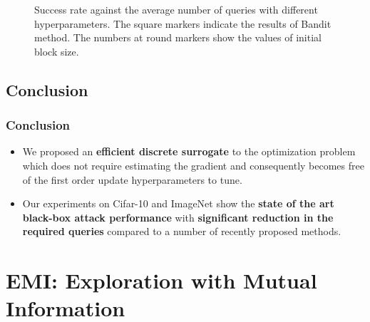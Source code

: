 \documentclass[10pt,mathserif]{beamer}
\begin{document}
\begin{frame}
\begin{figure}
    	\caption{Success rate against the average number of queries with different hyperparameters. The square markers indicate the results of Bandit method. The numbers at round markers show the values of initial block size.}
	\end{figure}
\end{frame}


\subsection{Conclusion}

\begin{frame}
    \frametitle{Conclusion}
    \begin{itemize}\itemsep=12pt
        \item We proposed an \textbf{efficient discrete surrogate} to the optimization problem which does not require estimating the gradient and consequently becomes free of the first order update hyperparameters to tune.\pause
        \item Our experiments on Cifar-10 and ImageNet show the \textbf{state of the art black-box attack performance} with \textbf{significant reduction in the required queries} compared to a number of recently proposed methods.
    \end{itemize}
\end{frame}

\section{EMI: Exploration with Mutual Information}
\end{document}
